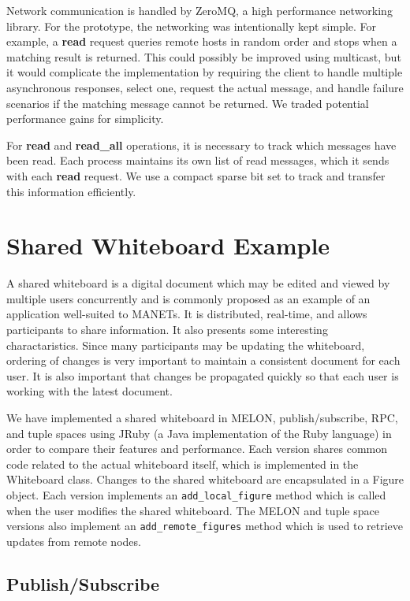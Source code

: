 \documentclass{llncs}
\begin{document}
Network communication is handled by ZeroMQ\cite{hintjens2013zeromq}, a high performance networking library. For the prototype, the networking was intentionally kept simple. For example, a \textbf{read} request queries remote hosts in random order and stops when a matching result is returned. This could possibly be improved using multicast, but it would complicate the implementation by requiring the client to handle multiple asynchronous responses, select one, request the actual message, and handle failure scenarios if the matching message cannot be returned. We traded potential performance gains for simplicity. 

For \textbf{read} and \textbf{read\_all} operations, it is necessary to track which messages have been read. Each process maintains its own list of read messages, which it sends with each \textbf{read} request. We use a compact sparse bit set to track and transfer this information efficiently.

\section{Shared Whiteboard Example}\label{sec:wb}

A shared whiteboard is a digital document which may be edited and viewed by multiple users concurrently and is commonly proposed as an example of an application well-suited to MANETs. It is distributed, real-time, and allows participants to share information. It also presents some interesting charactaristics. Since many participants may be updating the whiteboard, ordering of changes is very important to maintain a consistent document for each user. It is also important that changes be propagated quickly so that each user is working with the latest document.

We have implemented a shared whiteboard in MELON, publish/subscribe, RPC, and tuple spaces using JRuby (a Java implementation of the Ruby language) in order to compare their features and performance.
Each version shares common code related to the actual whiteboard itself, which is implemented in the Whiteboard class.
Changes to the shared whiteboard are encapsulated in a Figure object. Each version implements an \texttt{add\_local\_figure} method which is called when the user modifies the shared whiteboard.
The MELON and tuple space versions also implement an \texttt{add\_remote\_figures} method which is used to retrieve updates from remote nodes.

\subsection{Publish/Subscribe}
\end{document}

